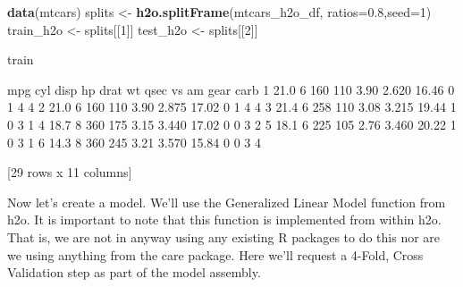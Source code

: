 \documentclass[
]{book}
\newenvironment{Shaded}{\begin{snugshade}}{\end{snugshade}}
\newcommand{\DataTypeTok}[1]{\textcolor[rgb]{0.13,0.29,0.53}{#1}}
\newcommand{\DecValTok}[1]{\textcolor[rgb]{0.00,0.00,0.81}{#1}}
\newcommand{\FloatTok}[1]{\textcolor[rgb]{0.00,0.00,0.81}{#1}}
\newcommand{\KeywordTok}[1]{\textcolor[rgb]{0.13,0.29,0.53}{\textbf{#1}}}
\newcommand{\NormalTok}[1]{#1}
\newcommand{\StringTok}[1]{\textcolor[rgb]{0.31,0.60,0.02}{#1}}
\begin{document}
\begin{Shaded}
\begin{Highlighting}[]
\KeywordTok{data}\NormalTok{(mtcars)}
\NormalTok{splits <-}\StringTok{ }\KeywordTok{h2o.splitFrame}\NormalTok{(mtcars_h2o_df, }\DataTypeTok{ratios=}\FloatTok{0.8}\NormalTok{,}\DataTypeTok{seed=}\DecValTok{1}\NormalTok{)}
\NormalTok{train_h2o <-}\StringTok{ }\NormalTok{splits[[}\DecValTok{1}\NormalTok{]]}
\NormalTok{test_h2o  <-}\StringTok{ }\NormalTok{splits[[}\DecValTok{2}\NormalTok{]]}

\NormalTok{train}

\NormalTok{mpg cyl disp  hp drat    wt  qsec vs am gear carb}
\DecValTok{1} \FloatTok{21.0}   \DecValTok{6}  \DecValTok{160} \DecValTok{110} \FloatTok{3.90} \FloatTok{2.620} \FloatTok{16.46}  \DecValTok{0}  \DecValTok{1}    \DecValTok{4}    \DecValTok{4}
\DecValTok{2} \FloatTok{21.0}   \DecValTok{6}  \DecValTok{160} \DecValTok{110} \FloatTok{3.90} \FloatTok{2.875} \FloatTok{17.02}  \DecValTok{0}  \DecValTok{1}    \DecValTok{4}    \DecValTok{4}
\DecValTok{3} \FloatTok{21.4}   \DecValTok{6}  \DecValTok{258} \DecValTok{110} \FloatTok{3.08} \FloatTok{3.215} \FloatTok{19.44}  \DecValTok{1}  \DecValTok{0}    \DecValTok{3}    \DecValTok{1}
\DecValTok{4} \FloatTok{18.7}   \DecValTok{8}  \DecValTok{360} \DecValTok{175} \FloatTok{3.15} \FloatTok{3.440} \FloatTok{17.02}  \DecValTok{0}  \DecValTok{0}    \DecValTok{3}    \DecValTok{2}
\DecValTok{5} \FloatTok{18.1}   \DecValTok{6}  \DecValTok{225} \DecValTok{105} \FloatTok{2.76} \FloatTok{3.460} \FloatTok{20.22}  \DecValTok{1}  \DecValTok{0}    \DecValTok{3}    \DecValTok{1}
\DecValTok{6} \FloatTok{14.3}   \DecValTok{8}  \DecValTok{360} \DecValTok{245} \FloatTok{3.21} \FloatTok{3.570} \FloatTok{15.84}  \DecValTok{0}  \DecValTok{0}    \DecValTok{3}    \DecValTok{4}

\NormalTok{[}\DecValTok{29}\NormalTok{ rows x }\DecValTok{11}\NormalTok{ columns] }
\end{Highlighting}
\end{Shaded}

Now let's create a model. We'll use the Generalized Linear Model function from h2o. It is important to note that this function is implemented from within h2o. That is, we are not in anyway using any existing R packages to do this nor are we using anything from the care package. Here we'll request a 4-Fold, Cross Validation step as part of the model assembly.
\end{document}

